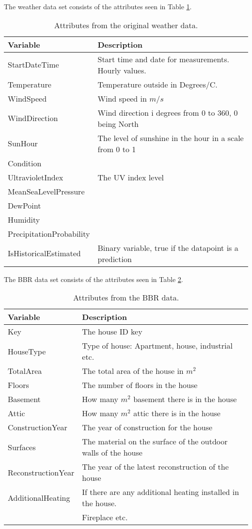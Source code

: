 \noindent The weather data set consists of the attributes seen in Table \ref{tab: weatherdata}.
\begin{table}[H]
    \centering
    \begin{tabular}{ll}
     \hline
     \textbf{Variable} & \textbf{Description} \\
    \hline
    \hline
    StartDateTime  &  Start time and date for measurements. Hourly values.\\
    Temperature  &  Temperature outside in Degrees/C. \\
    WindSpeed  & Wind speed in $m/s$\\
    WindDirection  & Wind direction i degrees from 0 to 360, 0 being North \\
    SunHour  & The level of sunshine in the hour in a scale from 0 to 1 \\
    Condition  &  \\
    UltravioletIndex  & The UV index level \\
    MeanSeaLevelPressure  &  \\
    DewPoint  &  \\
    Humidity  &  \\
    PrecipitationProbability & \\
    IsHistoricalEstimated & Binary variable, true if the datapoint is a prediction \\
    \hline
    \end{tabular}
    \caption{Attributes from the original weather data.}
    \label{tab: weatherdata}
\end{table}   

\noindent The BBR data set consists of the attributes seen in Table \ref{tab: BBR}.
\begin{table}[H]
    \centering
    \begin{tabular}{ll}
     \hline
     \textbf{Variable} & \textbf{Description} \\
    \hline
    \hline
    Key  &  The house ID key\\
    HouseType  &  Type of house: Apartment, house, industrial etc. \\
    TotalArea  & The total area of the house in $m^2$ \\
    Floors  & The number of floors in the house \\
    Basement  & How many $m^2$ basement there is in the house \\
    Attic  & How many $m^2$ attic there is in the house \\
    ConstructionYear  & The year of construction for the house  \\
    Surfaces  & The material on the surface of the outdoor walls of the house \\
    ReconstructionYear  & The year of the latest reconstruction of the house \\
    AdditionalHeating  & If there are any additional heating installed in the house. \\ & Fireplace etc. \\
    \hline
    \end{tabular}
    \caption{Attributes from the BBR data.}
    \label{tab: BBR}
\end{table}   


